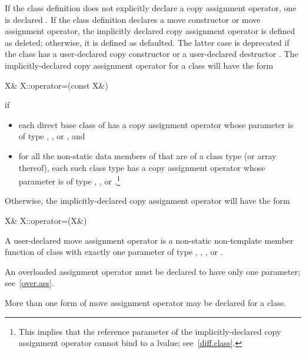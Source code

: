 \pnum
If the class definition does not explicitly declare a copy assignment operator,
one is declared .
If the class definition declares a move
constructor or move assignment operator, the implicitly declared copy
assignment operator is defined as deleted; otherwise, it is defined as
defaulted.
The latter case is deprecated if the class has a user-declared copy constructor
or a user-declared destructor .
The implicitly-declared copy assignment operator for a class
will have the form
\begin{codeblock}
X& X::operator=(const X&)
\end{codeblock}
if
\begin{itemize}
\item
each direct base class  of 
has a copy assignment operator whose parameter is of type
, , or , and
\item
for all the non-static data members of 
that are of a class type  (or array thereof),
each such class type has a copy assignment operator whose parameter is of type
, ,
or .\footnote{This implies that the reference parameter of the
implicitly-declared copy assignment operator cannot bind to a
 lvalue; see~\ref{diff.class}.}
\end{itemize}

Otherwise, the implicitly-declared copy assignment operator
will have the form
\begin{codeblock}
X& X::operator=(X&)
\end{codeblock}

\pnum
A user-declared move assignment operator  is
a non-static non-template member function of class  with exactly
one parameter of type , , , or
.
\begin{note}
An overloaded assignment operator must be
declared to have only one parameter; see~\ref{over.ass}.
\end{note}
{}
\begin{note}
More
than one form of move assignment operator may be declared for a class.
\end{note}

